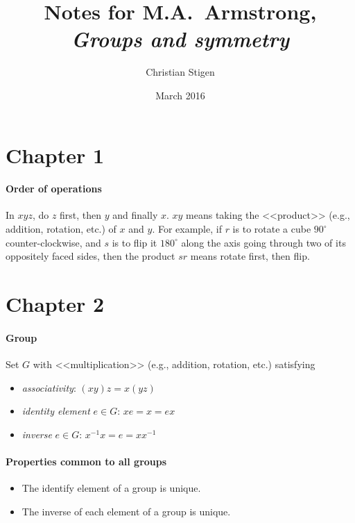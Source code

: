 \documentclass[a4paper,12pt]{article}
\title{Notes for M.A.~Armstrong,\\\Huge\textit{Groups and symmetry}}
\author{Christian Stigen}
\date{March 2016}
\begin{document}
  \maketitle
  \section*{Chapter 1}
  \paragraph{Order of operations} In $xyz$, do $z$ first, then $y$ and finally
  $x$. $xy$ means taking the <<product>> (e.g., addition, rotation, etc.) of
  $x$ and $y$. For example, if $r$ is to rotate a cube $90^\circ$
  counter-clockwise, and $s$ is to flip it $180^\circ$ along the axis going
  through two of its oppositely faced sides, then the product $sr$ means rotate
  first, then flip.

  \section*{Chapter 2}
  \paragraph{Group}  Set $G$ with <<multiplication>> (e.g., addition, rotation,
  etc.) satisfying
  \begin{itemize}
    \item \textit{associativity}: $(xy)z = x(yz)$
    \item \textit{identity element} $e \in G$: $xe=x=ex$
    \item \textit{inverse} $e \in G$: $x^{-1}x=e=xx^{-1}$
  \end{itemize}



    \paragraph{Properties common to all groups}
    \begin{itemize}
      \item The identify element of a group is unique.
      \item The inverse of each element of a group is unique.
    \end{itemize}
\end{document}
